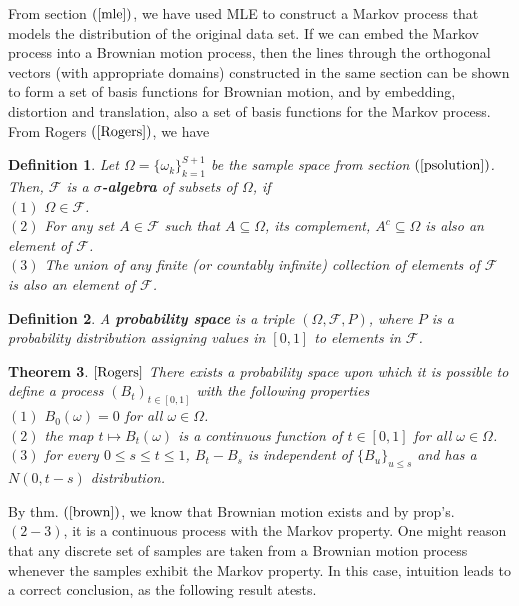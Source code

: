 \documentclass[11pt]{imsart}
\newtheorem{theorem}{Theorem}
\newtheorem{definition}[theorem]{Definition}
\begin{document}
From section $(\ref{mle})$, we have used MLE to construct a Markov process that models the distribution of the original data set.  If we can embed the Markov process into a Brownian motion process, then the lines through the orthogonal vectors (with appropriate domains) constructed in the same section can be shown to form a set of basis functions for Brownian motion, and by embedding, distortion and translation, also a set of basis functions for the Markov process.  From Rogers $(\cite{Rogers})$, we have

\begin{definition}
Let $\Omega = \{\omega_{k}\}_{k=1}^{S+1}$ be the sample space from section $(\ref{psolution})$.  Then, $\mathcal{F}$ is a \textbf{$\sigma$-algebra} of subsets of $\Omega$, if\\
$(1)$ $\Omega \in \mathcal{F}$.\\
$(2)$ For any set $A \in \mathcal{F}$ such that $A \subseteq \Omega$, its complement, $A^{c} \subseteq \Omega$ is also an element of $\mathcal{F}$.\\
$(3)$ The union of any finite (or countably infinite) collection of elements of $\mathcal{F}$ is also an element of $\mathcal{F}$.
\end{definition}

\begin{definition}
A \textbf{probability space} is a triple $(\Omega,\mathcal{F},P)$, where $P$ is a probability distribution assigning values in $[0,1]$ to elements in $\mathcal{F}$.
\end{definition}

\begin{theorem}
\label{brown}
$\cite[Theorem\ (6.1)\ Brownian\ Motion]{Rogers}$
There exists a probability space upon which it is possible to define a process $(B_{t})_{t \in [0,1]}$ with the following properties\\
$(1)$ $B_{0}(\omega)=0$ for all $\omega \in \Omega$.\\
$(2)$ the map $t \mapsto B_{t}(\omega)$ is a continuous function of $t \in [0,1]$ for all $\omega \in \Omega$.\\
$(3)$ for every $0 \le s \le t \le 1$, $B_{t}-B_{s}$ is independent of $\{B_{u}\}_{u \le s}$ and has a $N(0,t-s)$ distribution.
\end{theorem}

By thm. $(\ref{brown})$, we know that Brownian motion exists and by prop's. $(2-3)$, it is a continuous process with the Markov property.  One might reason that any discrete set of samples are taken from a Brownian motion process whenever the samples exhibit the Markov property.  In this case, intuition leads to a correct conclusion, as the following result atests.
\end{document}
